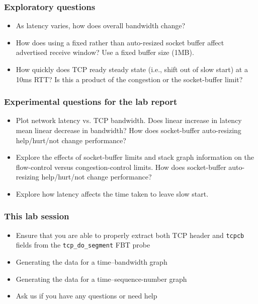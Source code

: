 \begin{frame}
  \frametitle{Exploratory questions}

  \begin{itemize}
    \item As latency varies, how does overall bandwidth change?
    \item How does using a fixed rather than auto-resized socket buffer affect
      advertised receive window?  Use a fixed buffer size (1MB).
    \item How quickly does TCP ready steady state (i.e., shift out of slow
      start) at a 10ms RTT?
      Is this a product of the congestion or the socket-buffer limit?
  \end{itemize}
\end{frame}

\begin{frame}
  \frametitle{Experimental questions for the lab report}

  \begin{itemize}
    \item Plot network latency vs. TCP bandwidth.
      Does linear increase in latency mean linear decrease in bandwidth?
      How does socket-buffer auto-resizing help/hurt/not change performance?
    \item Explore the effects of socket-buffer limits and stack graph
      information on the flow-control versus congestion-control limits.
      How does socket-buffer auto-resizing help/hurt/not change performance?
    \item Explore how latency affects the time taken to leave slow start.
  \end{itemize}
\end{frame}

\begin{frame}
  \frametitle{This lab session}

  \begin{itemize}
    \item Ensure that you are able to properly extract both TCP header and
      \texttt{tcpcb} fields from the \texttt{tcp\_do\_segment} FBT probe
    \item Generating the data for a time--bandwidth graph
    \item Generating the data for a time--sequence-number graph
    \item Ask us if you have any questions or need help
  \end{itemize}
\end{frame}


